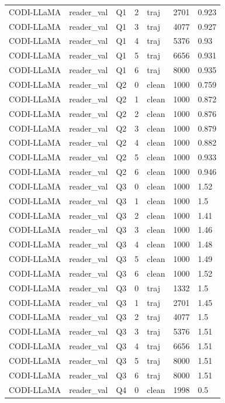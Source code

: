 \begin{longtable}{@{}p{}p{}p{}p{}p{}p{}p{}@{}}
CODI-LLaMA & reader\_val & Q1 & 2 & traj & 2701 & 0.923 \\
CODI-LLaMA & reader\_val & Q1 & 3 & traj & 4077 & 0.927 \\
CODI-LLaMA & reader\_val & Q1 & 4 & traj & 5376 & 0.93 \\
CODI-LLaMA & reader\_val & Q1 & 5 & traj & 6656 & 0.931 \\
CODI-LLaMA & reader\_val & Q1 & 6 & traj & 8000 & 0.935 \\
CODI-LLaMA & reader\_val & Q2 & 0 & clean & 1000 & 0.759 \\
CODI-LLaMA & reader\_val & Q2 & 1 & clean & 1000 & 0.872 \\
CODI-LLaMA & reader\_val & Q2 & 2 & clean & 1000 & 0.876 \\
CODI-LLaMA & reader\_val & Q2 & 3 & clean & 1000 & 0.879 \\
CODI-LLaMA & reader\_val & Q2 & 4 & clean & 1000 & 0.882 \\
CODI-LLaMA & reader\_val & Q2 & 5 & clean & 1000 & 0.933 \\
CODI-LLaMA & reader\_val & Q2 & 6 & clean & 1000 & 0.946 \\
CODI-LLaMA & reader\_val & Q3 & 0 & clean & 1000 & 1.52 \\
CODI-LLaMA & reader\_val & Q3 & 1 & clean & 1000 & 1.5 \\
CODI-LLaMA & reader\_val & Q3 & 2 & clean & 1000 & 1.41 \\
CODI-LLaMA & reader\_val & Q3 & 3 & clean & 1000 & 1.46 \\
CODI-LLaMA & reader\_val & Q3 & 4 & clean & 1000 & 1.48 \\
CODI-LLaMA & reader\_val & Q3 & 5 & clean & 1000 & 1.49 \\
CODI-LLaMA & reader\_val & Q3 & 6 & clean & 1000 & 1.52 \\
CODI-LLaMA & reader\_val & Q3 & 0 & traj & 1332 & 1.5 \\
CODI-LLaMA & reader\_val & Q3 & 1 & traj & 2701 & 1.45 \\
CODI-LLaMA & reader\_val & Q3 & 2 & traj & 4077 & 1.5 \\
CODI-LLaMA & reader\_val & Q3 & 3 & traj & 5376 & 1.51 \\
CODI-LLaMA & reader\_val & Q3 & 4 & traj & 6656 & 1.51 \\
CODI-LLaMA & reader\_val & Q3 & 5 & traj & 8000 & 1.51 \\
CODI-LLaMA & reader\_val & Q3 & 6 & traj & 8000 & 1.51 \\
CODI-LLaMA & reader\_val & Q4 & 0 & clean & 1998 & 0.5 \\

\end{longtable}
